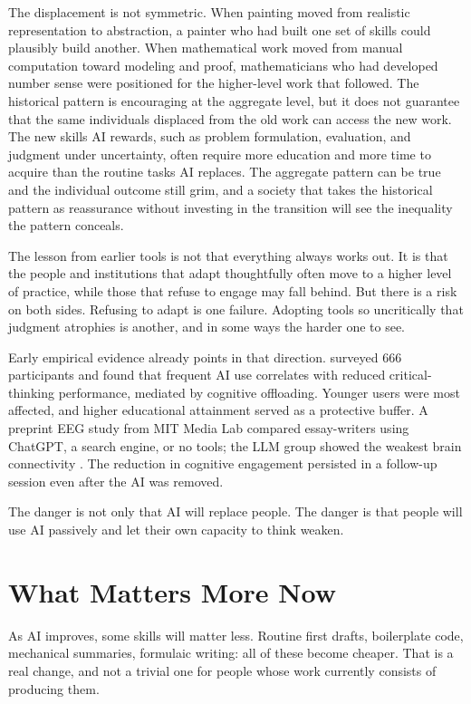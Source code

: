 \documentclass[12pt]{article}
\begin{document}
The displacement is not symmetric. When painting moved from realistic representation to abstraction, a painter who had built one set of skills could plausibly build another. When mathematical work moved from manual computation toward modeling and proof, mathematicians who had developed number sense were positioned for the higher-level work that followed. The historical pattern is encouraging at the aggregate level, but it does not guarantee that the same individuals displaced from the old work can access the new work. The new skills AI rewards, such as problem formulation, evaluation, and judgment under uncertainty, often require more education and more time to acquire than the routine tasks AI replaces. The aggregate pattern can be true and the individual outcome still grim, and a society that takes the historical pattern as reassurance without investing in the transition will see the inequality the pattern conceals.

The lesson from earlier tools is not that everything always works out. It is that the people and institutions that adapt thoughtfully often move to a higher level of practice, while those that refuse to engage may fall behind. But there is a risk on both sides. Refusing to adapt is one failure. Adopting tools so uncritically that judgment atrophies is another, and in some ways the harder one to see.

Early empirical evidence already points in that direction. \citet{gerlich2025aitools} surveyed 666 participants and found that frequent AI use correlates with reduced critical-thinking performance, mediated by cognitive offloading. Younger users were most affected, and higher educational attainment served as a protective buffer. A preprint EEG study from MIT Media Lab compared essay-writers using ChatGPT, a search engine, or no tools; the LLM group showed the weakest brain connectivity \citep{kosmyna2025brain}. The reduction in cognitive engagement persisted in a follow-up session even after the AI was removed.

The danger is not only that AI will replace people. The danger is that people will use AI passively and let their own capacity to think weaken.

\section{What Matters More Now}

As AI improves, some skills will matter less. Routine first drafts, boilerplate code, mechanical summaries, formulaic writing: all of these become cheaper. That is a real change, and not a trivial one for people whose work currently consists of producing them.
\end{document}
